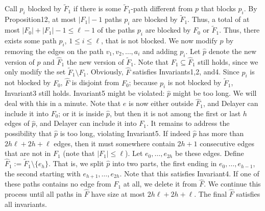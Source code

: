 \documentclass[10pt,a4paper]{article}
\begin{document}
Call $p_i$ blocked by $\widetilde F_1$ if there is some $\widetilde F_1$-path different from $p$ that blocks $p_i$. By Proposition12, at most $|F_1|-1$ paths $p_i$ are blocked by $\widetilde F_1$. Thus, a total of at most $|F_0|+|F_1|-1\le\ell-1$ of the paths $p_i$ are blocked by $F_0$ or $\widetilde F_1$. Thus, there exists some path $p_i$, $1\le i\le\ell$, that is not blocked. We now modify $p$ by removing the edges on the path $v_1,v_2,\ldots,a_i$ and adding $p_i$. Let $\hat p$ denote the new version of $p$ and $\hat F_1$ the new version of $\widetilde F_1$. Note that $F_1\subseteq\hat F_1$ still holds, since we only modify the set $\widetilde F_1\setminus F_1$. Obviously, $\hat F$ satisfies Invariants1,2, and4. Since $p_i$ is not blocked by $F_0$, $\hat F$ is disjoint from $F_0$; because $p_i$ is not blocked by $\widetilde F_1$, Invariant3 still holds. Invariant5 might be violated: $\hat p$ might be too long. We will deal with this in a minute.
Note that $e$ is now either outside $\hat F_1$, and Delayer can include it into $F_0$; or it is inside $\hat p$, but then it is not among the first or last $h$ edges of $\hat p$, and Delayer can include it into $F_1$.
It remains to address the possibility that $\hat p$ is too long, violating Invariant5. If indeed $\hat p$ has more than $2h\ell+2h+\ell$ edges, then it must somewhere contain $2h+1$ consecutive edges that are not in $F_1$ (note that $|F_1|\le\ell$). Let $e_0,\ldots,e_{2h}$ be these edges. Define $\hat F_1:=\widetilde F_1\setminus\{e_h\}$. That is, we split $\hat p$ into two parts, the first ending in $e_0,\ldots,e_{h-1}$, the second starting with $e_{h+1},\ldots,e_{2h}$. Note that this satisfies Invariant4. If one of these paths contains no edge from $F_1$ at all, we delete it from $\hat F$. We continue this process until all paths in $\hat F$ have size at most $2h\ell+2h+\ell$. The final $\hat F$ satisfies all invariants.
\end{document}

